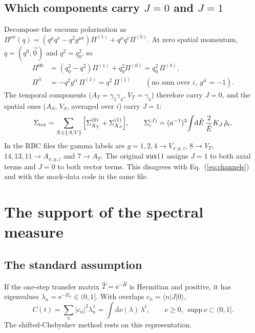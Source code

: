 \documentclass[11pt]{article}
\newcommand{\dd}{\mathrm{d}}
\newcommand{\ee}{\mathrm{e}}
\newcommand{\Sig}{\Sigma}
\theoremstyle{remark}
\begin{document}
\subsection{Which components carry $J=0$ and $J=1$}
Decompose the vacuum polarisation as
$\Pi^{\mu\nu}(q)=(q^\mu q^\nu-q^2g^{\mu\nu})\Pi^{(1)}+q^\mu q^\nu\Pi^{(0)}$. At zero spatial momentum, $q=(q^0,\vec0)$ and $q^2=q_0^2$, so
\begin{align}
 \Pi^{00}&=(q_0^2-q^2)\Pi^{(1)}+q_0^2\Pi^{(0)}=q_0^2\,\Pi^{(0)},\\
 \Pi^{ii}&=-q^2g^{ii}\,\Pi^{(1)}=q^2\,\Pi^{(1)}\qquad(\text{no sum over } i,\ g^{ii}=-1).
\end{align}
The temporal components ($A_T=\gamma_5\gamma_4$, $V_T=\gamma_4$) therefore carry $J=0$, and the spatial ones ($A_S$, $V_S$, averaged over $i$) carry $J=1$:
\begin{equation}
 \Sig_{\rm tot}=\sum_{X\in\{A,V\}}\Big[\Sig^{(0)}_{X_T}+\Sig^{(1)}_{X_S}\Big],\qquad
 \Sig^{(J)}_{c}=(a^{-1})^2\!\int\!\dd\hat E\,\frac{2}{\hat E}K_J\,\hat\rho_c .
 \label{eq:channels}
\end{equation}
In the RBC files the gamma labels are $g=1,2,4\to V_{x,y,z}$, $8\to V_T$, $14,13,11\to A_{x,y,z}$ and $7\to A_T$.
The original \texttt{vus()} assigns $J=1$ to both axial terms and $J=0$ to both vector terms. This disagrees with Eq.~(\ref{eq:channels}) and with
the mock-data code in the same file.

\section{The support of the spectral measure}\label{sec:support}
\subsection{The standard assumption}
If the one-step transfer matrix $\hat T=\ee^{-\hat H}$ is Hermitian and positive, it has eigenvalues $\lambda_n=\ee^{-E_n}\in(0,1]$. With overlaps
$c_n=\langle n|J|0\rangle$,
\begin{equation}
 C(t)=\sum_n|c_n|^2\lambda_n^{\,t}=\int\dd\nu(\lambda)\,\lambda^t,\qquad \nu\ge0,\ \ \mathrm{supp}\,\nu\subset(0,1].
\end{equation}
The shifted-Chebyshev method rests on this representation.
\end{document}
